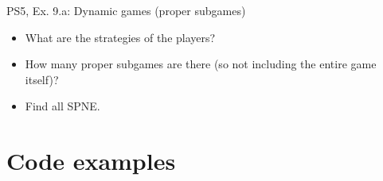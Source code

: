 \begin{frame}{PS5, Ex. 9.a: Dynamic games (proper subgames)}
  \begin{itemize}
    \item What are the strategies of the players?
    \item How many proper subgames are there (so not including the entire game itself)?
    \item Find all SPNE.
  \end{itemize}
\end{frame}




\section{Code examples} %

